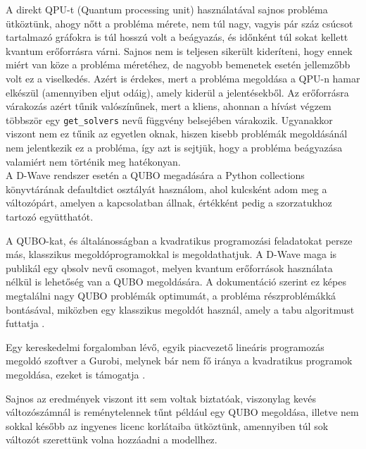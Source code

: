 A direkt QPU-t (Quantum processing unit) használatával sajnos probléma ütköztünk, ahogy nőtt a probléma mérete, nem túl nagy, vagyis pár száz csúcsot tartalmazó gráfokra is túl hosszú volt a beágyazás, és időnként túl sokat kellett kvantum erőforrásra várni. Sajnos nem is teljesen sikerült kideríteni, hogy ennek miért van köze a probléma méretéhez, de nagyobb bemenetek esetén jellemzőbb volt ez a viselkedés. Azért is érdekes, mert a probléma megoldása a QPU-n hamar elkészül (amennyiben eljut odáig), amely kiderül a jelentésekből. Az erőforrásra várakozás azért tűnik valószínűnek, mert a kliens, ahonnan a hívást végzem többször egy \verb+get_solvers+ nevű függvény belsejében várakozik. Ugyanakkor viszont nem ez tűnik az egyetlen oknak, hiszen kisebb problémák megoldásánál nem jelentkezik ez a probléma, így azt is sejtjük, hogy a probléma beágyazása valamiért nem történik meg hatékonyan.\\

A D-Wave rendszer esetén a QUBO megadására a Python collections könyvtárának defaultdict osztályát használom, ahol kulcsként adom meg a változópárt, amelyen a kapcsolatban állnak, értékként pedig a szorzatukhoz tartozó együtthatót.



A QUBO-kat, és általánosságban a kvadratikus programozási feladatokat persze más, klasszikus megoldóprogramokkal is megoldathatjuk. A D-Wave maga is publikál egy qbsolv nevű csomagot, melyen kvantum erőforrások használata nélkül is lehetőség van a QUBO megoldására. A dokumentáció szerint ez képes megtalálni nagy QUBO problémák optimumát, a probléma részproblémákká bontásával, miközben egy klasszikus megoldót használ, amely a tabu algoritmust futtatja \cite{DWaveOceanQbsolv}. 

Egy kereskedelmi forgalomban lévő, egyik piacvezető lineáris programozás megoldó szoftver a Gurobi, melynek bár nem fő iránya a kvadratikus programok megoldása, ezeket is támogatja \cite{gurobi}. 

Sajnos az eredmények viszont itt sem voltak biztatóak, viszonylag kevés változószámnál is reménytelennek tűnt például egy QUBO megoldása, illetve nem sokkal később az ingyenes licenc korlátaiba ütköztünk, amennyiben túl sok változót szerettünk volna hozzáadni a modellhez. 




